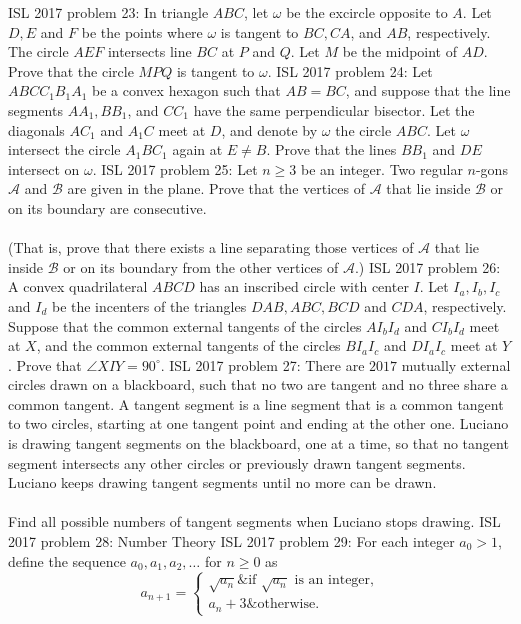 ISL 2017 problem 23:  In triangle $ABC$, let $\omega$ be the excircle opposite to $A$. Let $D, E$ and $F$ be the points where $\omega$ is tangent to $BC, CA$, and $AB$, respectively. The circle $AEF$ intersects line $BC$ at $P$ and $Q$. Let $M$ be the midpoint of $AD$. Prove that the circle $MPQ$ is tangent to $\omega$. 
ISL 2017 problem 24:  Let $ABCC_1B_1A_1$ be a convex hexagon such that $AB=BC$, and suppose that the line segments $AA_1, BB_1$, and $CC_1$ have the same perpendicular bisector. Let the diagonals $AC_1$ and $A_1C$ meet at $D$, and denote by $\omega$ the circle $ABC$. Let $\omega$ intersect the circle $A_1BC_1$ again at $E \neq B$. Prove that the lines $BB_1$ and $DE$ intersect on $\omega$. 
ISL 2017 problem 25:  Let $n\ge3$ be an integer. Two regular $n$-gons $\mathcal{A}$ and $\mathcal{B}$ are given in the plane. Prove that the vertices of $\mathcal{A}$ that lie inside $\mathcal{B}$ or on its boundary are consecutive. \\\\
(That is, prove that there exists a line separating those vertices of $\mathcal{A}$ that lie inside $\mathcal{B}$ or on its boundary from the other vertices of $\mathcal{A}$.) 
ISL 2017 problem 26:  A convex  quadrilateral $ABCD$ has an inscribed circle with center $I$. Let $I_a, I_b, I_c$ and $I_d$ be the incenters of the triangles $DAB, ABC, BCD$ and $CDA$, respectively. Suppose that the common external tangents of the circles $AI_bI_d$ and $CI_bI_d$ meet at $X$, and the common external tangents of the circles $BI_aI_c$ and $DI_aI_c$ meet at $Y$. Prove that $\angle{XIY}=90^{\circ}$. 
ISL 2017 problem 27:  There are $2017$ mutually external circles drawn on a blackboard, such that no two are tangent and no three share a common tangent. A tangent segment is a line segment that is a common tangent to two circles, starting at one tangent point and ending at the other one. Luciano is drawing tangent segments on the blackboard, one at a time, so that no tangent segment intersects any other circles or previously drawn tangent segments. Luciano keeps drawing tangent segments until no more can be drawn. \\\\
Find all possible numbers of tangent segments when Luciano stops drawing. 
ISL 2017 problem 28:  Number Theory 
ISL 2017 problem 29:  For each integer $a_0 > 1$, define the sequence $a_0, a_1, a_2, \ldots$ for $n \geq 0$ as
\[
a_{n+1} =
\begin{cases}
\sqrt{a_n} \& \text{if } \sqrt{a_n} \text{ is an integer,} \\
a_n + 3 \& \text{otherwise.}
\end{cases}
\]
